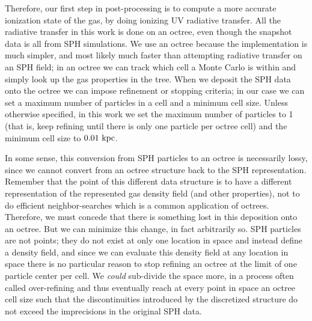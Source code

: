 Therefore, our first step in post-processing is to compute a more accurate ionization state of the gas, by doing ionizing UV radiative transfer.
All the radiative transfer in this work is done on an octree, even though the snapshot data is all from SPH simulations.
We use an octree because the implementation is much simpler, and most likely much faster than attempting radiative transfer on an SPH field; in an octree we can track which cell a Monte Carlo is within and simply look up the gas properties in the tree.
When we deposit the SPH data onto the octree we can impose refinement or stopping criteria; in our case we can set a maximum number of particles in a cell and a minimum cell size.
Unless otherwise specified, in this work we set the maximum number of particles to 1 (that is, keep refining until there is only one particle per octree cell) and the minimum cell size to $0.01\ \rm{kpc}$.

In some sense, this conversion from SPH particles to an octree is necessarily lossy, since we cannot convert from an octree structure back to the SPH representation.
Remember that the point of this different data structure is to have a different representation of the represented gas density field (and other properties), not to do efficient neighbor-searches which is a common application of octrees.
Therefore, we must concede that there is something lost in this deposition onto an octree.
But we can minimize this change, in fact arbitrarily so.
SPH particles are not points; they do not exist at only one location in space and instead define a density field, and since we can evaluate this density field at any location in space there is no particular reason to stop refining an octree at the limit of one particle center per cell.
We \emph{could} sub-divide the space more, in a process often called over-refining and thus eventually reach at every point in space an octree cell size such that the discontinuities introduced by the discretized structure do not exceed the imprecisions in the original SPH data.

